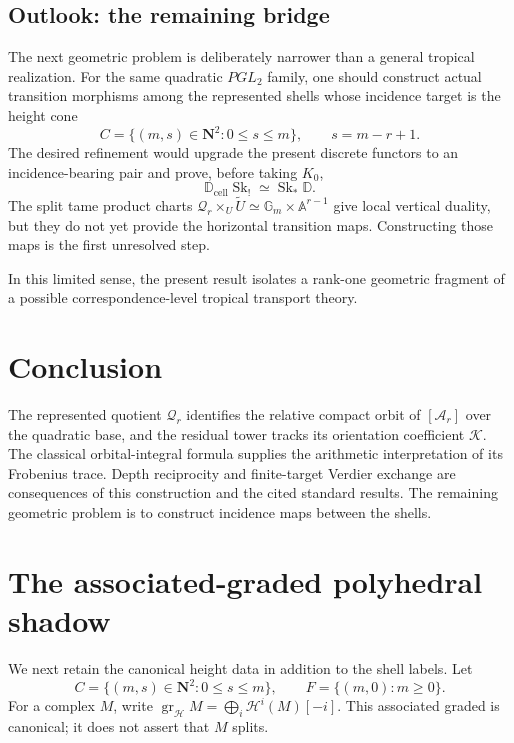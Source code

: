 \documentclass[11pt]{article}
\theoremstyle{definition}
\theoremstyle{remark}
\newcommand{\cK}{\mathcal K}
\newcommand{\D}{\mathbb D}
\newcommand{\Dcell}{\mathbb D_{\mathrm{cell}}}
\newcommand{\Sk}{\operatorname{Sk}}
\begin{document}
\subsection{Outlook: the remaining bridge}

The next geometric problem is deliberately narrower than a general tropical
realization.  For the same quadratic $PGL_2$ family, one should construct
actual transition morphisms among the represented shells whose incidence
target is the height cone
\[
 C=\{(m,s)\in\mathbf N^2:0\le s\le m\},
 \qquad s=m-r+1.
\]
The desired refinement would upgrade the present discrete functors to an
incidence-bearing pair and prove, before taking $K_0$,
\[
 \Dcell\Sk_!\simeq\Sk_*\D.
\]
The split tame product charts
$\mathscr Q_r\times_U\widetilde U\simeq\mathbb G_m\times\mathbb A^{r-1}$
give local vertical duality, but they do not yet provide the horizontal
transition maps.  Constructing those maps is the first unresolved step.

In this limited sense, the present result isolates a rank-one geometric
fragment of a possible correspondence-level tropical transport theory.

\section{Conclusion}

The represented quotient $\mathscr Q_r$ identifies the relative compact
orbit of $[\mathcal A_r]$ over the quadratic base, and the residual tower
tracks its orientation coefficient $\cK$.  The classical orbital-integral
formula supplies the arithmetic interpretation of its Frobenius trace.
Depth reciprocity and finite-target Verdier exchange are consequences of
this construction and the cited standard results.  The remaining
geometric problem is to construct incidence maps between the shells.

\appendix

\section{The associated-graded polyhedral shadow}

We next retain the canonical height data in addition to the shell labels.  Let
\[
 C=\{(m,s)\in\mathbf N^2:0\le s\le m\},
 \qquad F=\{(m,0):m\ge0\}.
\]
For a complex $M$, write
$\operatorname{gr}_{\mathcal H}M=\bigoplus_i\mathcal H^i(M)[-i]$.
This associated graded is canonical; it does not assert that $M$ splits.
\end{document}
